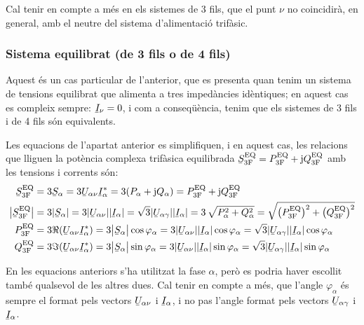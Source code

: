 Cal tenir en compte a m\'{e}s en els sistemes de 3 fils, que el punt
$\nu$ no coincidir\`{a}, en general, amb el neutre del sistema
d'alimentaci\'{o} trif\`{a}sic.

\subsubsection{Sistema equilibrat (de 3 fils o de 4 fils)}

Aquest \'{e}s un cas particular de l'anterior, que es presenta quan
tenim un sistema de tensions equilibrat que alimenta a tres
imped\`{a}ncies id\`{e}ntiques; en aquest cas es compleix sempre:
$\cmplx{I}_\nu=0$, i com a conseq\"{u}\`{e}ncia, tenim que els sistemes de 3
fils i de 4 fils s\'{o}n equivalents.

Les equacions de l'apartat anterior es simplifiquen, i en aquest
cas, les relacions que lliguen la  pot\`{e}ncia complexa trif\`{a}sica
equilibrada $\cmplx{S}\ped{3F}\ap{EQ} = P\ped{3F}\ap{EQ} + \ju
Q\ped{3F}\ap{EQ}$ amb les tensions i corrents s\'{o}n:
\begin{align}
    \cmplx{S}\ped{3F}\ap{EQ} &= 3\cmplx{S}_\alpha = 3\cmplx{U}_{\alpha\nu} \cmplx{I}_\alpha^* =
    3 (P_\alpha + \ju Q_\alpha) = P\ped{3F}\ap{EQ} +\ju Q\ped{3F}\ap{EQ} \label{eq:s_3f_eq}\\
    \big|\cmplx{S}\ped{3F}\ap{EQ}\big| &= 3|\cmplx{S}_\alpha | =   3 |\cmplx{U}_{\alpha\nu}| |\cmplx{I}_\alpha| =
    \sqrt{3} |\cmplx{U}_{\alpha\gamma}| |\cmplx{I}_\alpha| = 3\,\sqrt{P_\alpha^2 + Q_\alpha^2} =
    \sqrt{\big(P\ped{3F}\ap{EQ}\big)^2 + \big(Q\ped{3F}\ap{EQ}\big)^2} \\
    P\ped{3F}\ap{EQ} &= 3\Re(\cmplx{U}_{\alpha\nu} \cmplx{I}_\alpha^*) =
    3\big|\cmplx{S}_\alpha\big| \cos \varphi_\alpha = 3 |\cmplx{U}_{\alpha\nu}|
    |\cmplx{I}_\alpha|\label{eq:p_3f_34}
    \cos \varphi_\alpha = \sqrt{3} |\cmplx{U}_{\alpha\gamma}||\cmplx{I}_\alpha| \cos \varphi_\alpha \\
    Q\ped{3F}\ap{EQ} &= 3\Im(\cmplx{U}_{\alpha\nu} \cmplx{I}_\alpha^*) =
    3\big|\cmplx{S}_\alpha\big|  \sin \varphi_\alpha = 3 |\cmplx{U}_{\alpha\nu}| |\cmplx{I}_\alpha|\label{eq:q_3f_34}
    \sin\varphi_\alpha=\sqrt{3} |\cmplx{U}_{\alpha\gamma}||\cmplx{I}_\alpha|\sin \varphi_\alpha
\end{align}

En les equacions anteriors s'ha utilitzat la fase $\alpha$, per\`{o} es
podria haver escollit tamb\'{e} qualsevol de les altres dues. Cal tenir
en compte a m\'{e}s, que l'angle $\varphi_\alpha$ \'{e}s sempre el format
pels vectors $\cmplx{U}_{\alpha\nu}$ i $\cmplx{I}_\alpha$, i no pas
l'angle format pels vectors $\cmplx{U}_{\alpha\gamma}$ i
$\cmplx{I}_\alpha$.

